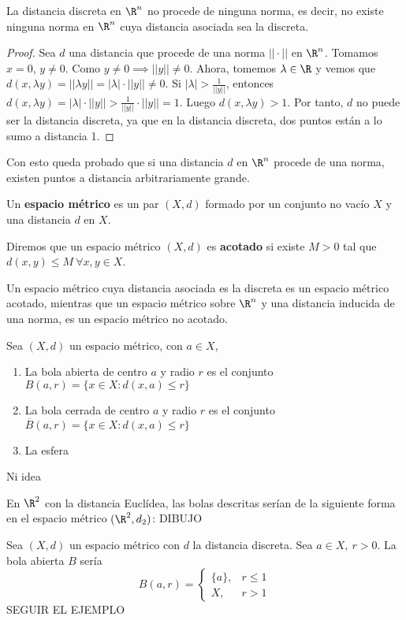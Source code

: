 \begin{properties}
  La distancia discreta en $\R^n$ no procede de ninguna norma, es decir, no existe ninguna norma en $\R^n$ cuya distancia asociada sea la discreta.
\end{properties}
\begin{proof}
  Sea $d$ una distancia que procede de una norma $||\cdot||$ en $\R^n$. Tomamos $x=0$, $y\neq0$. Como $y \neq 0 \implies ||y|| \neq 0$. Ahora, tomemos $\lambda\in\R$ y vemos que $d(x,\lambda y) = ||\lambda y|| = |\lambda|\cdot||y||\neq 0$.
  Si $|\lambda| > \frac{1}{||y||}$, entonces $d(x,\lambda y) = |\lambda| \cdot ||y|| > \frac{1}{||y||} \cdot ||y||=1$. Luego $d(x,\lambda y) > 1$. Por tanto, $d$ no puede ser la distancia discreta, ya que en la distancia discreta, dos puntos están a lo sumo a distancia 1.
\end{proof}
Con esto queda probado que si una distancia $d$ en $\R^n$ procede de una norma, existen puntos a distancia arbitrariamente grande.

\begin{ndef}
  Un \textbf{espacio métrico} es un par $(X,d)$ formado por un conjunto no vacío $X$ y una distancia $d$ en $X$.
\end{ndef}
\begin{ndef}
  Diremos que un espacio métrico $(X,d)$ es \textbf{acotado} si existe $M>0$ tal que $d(x,y)\leq M \ \forall x,y \in X$.
\end{ndef}
\begin{exmp}
  Un espacio métrico cuya distancia asociada es la discreta es un espacio métrico acotado, mientras que un espacio métrico sobre $\R^n$ y una distancia inducida de una norma, es un espacio métrico no acotado.
\end{exmp}

\begin{ndef}
  Sea $(X,d)$ un espacio métrico, con $a \in X$,
  \begin{enumerate}
    \item La bola abierta de centro $a$ y radio $r$ es el conjunto $B(a,r)= \{x \in X : d(x,a) \leq r\}$
    \item La bola cerrada de centro $a$ y radio $r$ es el conjunto $\overline{B}(a,r)= \{x \in X : d(  x,a) \leq r\}$
    \item La esfera
  \end{enumerate}

\end{ndef}
\begin{exmp}
  Ni idea
\end{exmp}
\begin{exmp}
  En $\R^2$ con la distancia Euclídea, las bolas descritas serían de la siguiente forma en el espacio métrico $(\R^2,d_2)$:
  DIBUJO
\end{exmp}
\begin{exmp}
  Sea $(X,d)$ un espacio métrico con $d$ la distancia discreta. Sea $a \in X,\ r>0$. La bola abierta $B$ sería
  \[B(a,r)=
    \begin{cases}
      \{a\}, & r \leq 1 \\ X,& r>1
    \end{cases}\]
  SEGUIR EL EJEMPLO
\end{exmp}


